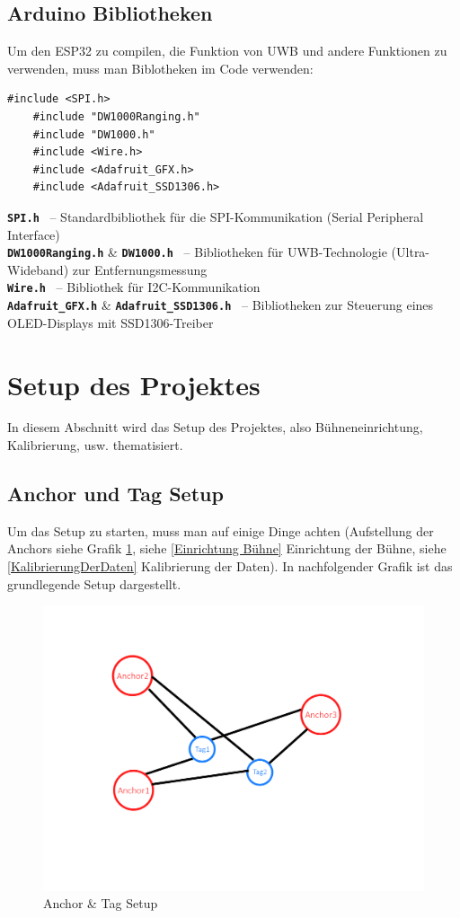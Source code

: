 \newpage
\subsection{Arduino Bibliotheken}
Um den ESP32 zu compilen, die Funktion von UWB und andere Funktionen zu verwenden, muss man Biblotheken im Code verwenden: 
\begin{lstlisting}[style=C++, caption=Bibliotheken, captionpos=b]
	#include <SPI.h>
	#include "DW1000Ranging.h"
	#include "DW1000.h"
	#include <Wire.h>
	#include <Adafruit_GFX.h>
	#include <Adafruit_SSD1306.h>
\end{lstlisting}

\textbf{\texttt{SPI.h}} \ – Standardbibliothek für die SPI-Kommunikation (Serial Peripheral Interface) \\
\textbf{\texttt{DW1000Ranging.h}} \& \textbf{\texttt{DW1000.h}} \ – Bibliotheken für UWB-Technologie (Ultra-Wideband) zur Entfernungsmessung \\
\textbf{\texttt{Wire.h}} \ – Bibliothek für I2C-Kommunikation \\
\textbf{\texttt{Adafruit\_GFX.h}} \& \textbf{\texttt{Adafruit\_SSD1306.h}} \ – Bibliotheken zur Steuerung eines OLED-Displays mit SSD1306-Treiber


\newpage
\section{Setup des Projektes}
In diesem Abschnitt wird das Setup des Projektes, also Bühneneinrichtung, Kalibrierung, usw. thematisiert.

\subsection{Anchor und Tag Setup}
Um das Setup zu starten, muss man auf einige Dinge achten (Aufstellung der Anchors siehe Grafik \ref{fig:AnchorTagSetup}, siehe \ref{Einrichtung Bühne} Einrichtung der Bühne, siehe \ref{KalibrierungDerDaten} Kalibrierung der Daten). In nachfolgender Grafik ist das grundlegende Setup dargestellt.

\begin{figure}[H]
	\centering
	\includegraphics[width=0.9\linewidth]{images/AnchorTagSetup.png}
	\caption[AnchorTagSetup]{Anchor \& Tag Setup}
	\label{fig:AnchorTagSetup}
\end{figure}

